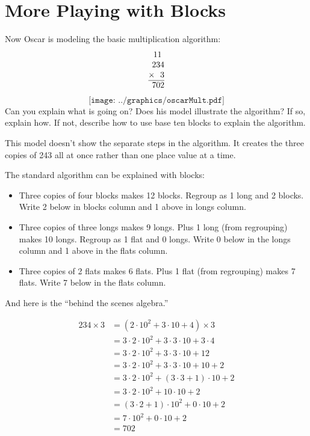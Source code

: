 \newpage
\section{More Playing with Blocks}\label{A:B2} 

\begin{prob}
Now Oscar is modeling the basic multiplication algorithm:
\[
\begin{tabular}{@{}r@{}}
11~~\\
234\\
$\times$~~3\\ \hline
702
\end{tabular}
\]
\[
\texttt{[image: ../graphics/oscarMult.pdf]}
\]
Can you explain what is going on?  Does his model illustrate the algorithm?  If so, explain how.  If not, describe how to use base ten blocks to explain the algorithm.  
\end{prob}

\begin{teachingnote}
This model doesn't show the separate steps in the algorithm.  It creates the three copies of 243 all at once rather than one place value at a time.  

The standard algorithm can be explained with blocks:  
\begin{itemize}
\item Three copies of four blocks makes 12 blocks.  Regroup as 1 long and 2 blocks. Write 2 below in blocks column and 1 above in longs column.
\item Three copies of three longs makes 9 longs.  Plus 1 long (from regrouping) makes 10 longs.  Regroup as 1 flat and 0 longs.  Write 0 below in the longs column and 1 above in the flats column.  
\item Three copies of 2 flats makes 6 flats.  Plus 1 flat (from regrouping) makes 7 flats.  Write 7 below in the flats column.  
\end{itemize}

And here is the ``behind the scenes algebra.''

\begin{align*}
234 \times 3 & = (2\cdot 10^2 + 3\cdot 10 + 4)\times 3 \\
&= 3\cdot 2\cdot 10^2 + 3\cdot 3\cdot 10 + 3\cdot 4 \\
&= 3\cdot 2\cdot 10^2 + 3\cdot 3\cdot 10 + 12 \\
&= 3\cdot 2\cdot 10^2 + 3\cdot 3\cdot 10 + 10 + 2\\
&= 3\cdot 2\cdot 10^2 + (3\cdot 3 + 1)\cdot 10 + 2\\
&= 3\cdot 2\cdot 10^2 + 10 \cdot 10 + 2\\
&= (3\cdot 2 + 1) \cdot 10^2 + 0 \cdot 10 + 2\\
&= 7\cdot 10^2 + 0 \cdot 10 + 2\\
&=702
\end{align*}
\end{teachingnote}

